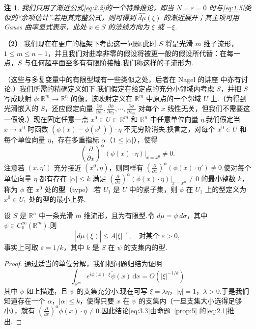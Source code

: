 \documentclass[
  BookTitleCN={傅里叶分析中的振动积分},
  BookTitleEN={Oscillatory Integrals in Fourier Analysis},
  OriginalAuthor={E.~M. Stein},
  OriginalEdition={Proc. Sympos. Pure Math. 35, Part~1},
  OriginalPublisher={American Mathematical Society},
  OriginalYear={1979},
  Translator={翻译及重排},
  ModelUsed={Codex CLI},
  Biblatex=false,
  TranslationDate={2026年8月27日}
]{mathtranslation}
\numberwithin{equation}{chapter}   %
\newtheorem*{remark*}{注}
\newcommand{\R}{\mathbb{R}}
\begin{document}
\begin{remark*}
  我们只用了渐近公式\eqref{eq:2.2}的一个特殊推论，即当 $N=r=0$ 时与\eqref{eq:1.5}类似的``余项估计''.若用其完整公式，则可得到 $\widehat{d\mu}(\xi)$ 的渐近展开；其主项可用 Gauss 曲率显式表示，此处 $x\in S$ 的法线方向为 $\xi$ 或 $-\xi$.
\end{remark*}

\textbf{（2）} 我们现在在更广的框架下考虑这一问题.此时 $S$ 将是光滑 $m$ 维子流形，$1\leq m\leq n-1$，并且我们对曲率非零的假设将被更一般的假设所代替：在每一点，$S$ 与任何超平面至多有有限阶接触.我们称这样的子流形为.

（这些与多复变量中的有限型域有一些类似之处，后者在 Nagel 的讲座 \cite{ref21} 中亦有讨论.）我们所需的精确定义如下.我们假定在给定点的充分小邻域内考虑 $S$，并把 $S$ 写成映射 $\phi:\R^{m}\to\R^{n}$ 的像，该映射定义在 $\R^{m}$ 中原点的一个邻域 $U$ 上.（为得到光滑嵌入的 $S$，还应假定向量 $\frac{\partial\phi}{\partial x_1},\frac{\partial\phi}{\partial x_2},\cdots,\frac{\partial\phi}{\partial x_m}$ 对每个 $x$ 线性无关，但我们不需要这一假设.）现在固定任意一点 $x^{0}\in U\subset\R^{m}$ 和 $\R^{n}$ 中任意单位向量 $\eta$.我们假定当 $x\to x^{0}$ 时函数 $(\phi(x)-\phi(x^{0}))\cdot\eta$ 不无穷阶消失.换言之，对每个 $x^{0}\in U$ 和每个单位向量 $\eta$，存在多重指标 $\alpha$（$1\leq|\alpha|$），使得
\[
  \left(\frac{\partial}{\partial x}\right)^{\alpha}(\phi(x)\cdot\eta)\Big|_{x=x^{0}}\neq0 .
\]
注意若 $(x,\eta')$ 充分接近 $(x^{0},\eta)$，则同样有 $\left(\frac{\partial}{\partial x}\right)^{\alpha}(\phi(x)\cdot\eta')\neq0$.使对每个单位向量 $\eta$ 都有存在 $|\alpha|\leq k$ 满足 $\left(\frac{\partial}{\partial x}\right)^{\alpha}(\phi(x)\cdot\eta)\big|_{x=x^{0}}\neq0$ 的最小整数 $k$，称为 $\phi$ 在 $x^{0}$ 处的\textbf{型}（type）.若 $U_{1}$ 是 $U$ 中的紧子集，则 $\phi$ 在 $U_{1}$ 上的型定义为 $x^{0}\in U_{1}$ 处的型的最小上界.

\begin{theorem}\label{thm:2}
  设 $S$ 是 $\R^n$ 中一条光滑 $m$ 维流形，且为有限型.令 $d\mu=\psi\,d\sigma$，其中 $\psi\in C_0^\infty(\R^{m})$.则
  \begin{equation}
    |\widehat{d\mu}(\xi)|\leq A|\xi|^{-\varepsilon},\quad\text{对某个 }\varepsilon>0, \label{eq:3.3}
  \end{equation}
  事实上可取 $\varepsilon=1/k$，其中 $k$ 是 $S$ 在 $\psi$ 的支集内的型.
\end{theorem}

\begin{proof}
  通过适当的单位分解，我们把问题归结为证明
  \[
    \int_{\R^{m}}e^{i\phi(x)\cdot\xi}\tilde\psi(x)\,\mathrm{d}x = O(|\xi|^{-1/k})
  \]
  其中 $\phi$ 如上描述，且 $\tilde\psi$ 的支集充分小.现在可写 $\xi=\lambda\eta$，$|\eta|=1$，$\lambda>0$.于是我们知道存在一个 $\alpha$，$|\alpha|\leq k$，使得只要 $x$ 在 $\tilde\psi$ 的支集内（一旦支集大小选得足够小），就有 $\left(\frac{\partial}{\partial x}\right)^{\alpha}\phi(x)\cdot\eta\neq0$.因此结论\eqref{eq:3.3}由命题~\ref{prop:5} 的\eqref{eq:2.1}推出.
\end{proof}
\end{document}
